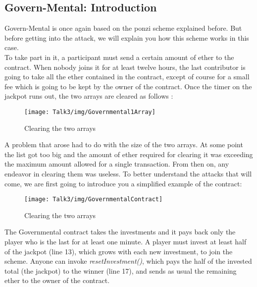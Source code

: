 \subsection{Govern-Mental: Introduction}
Govern-Mental is once again based on the ponzi scheme explained before. But before getting into the attack, we will explain you how this scheme works in this case.\\
To take part in it, a participant must send a  certain amount of ether to the contract. When nobody joins it for at least twelve hours, the last contributor is going to take all the ether contained in the contract, except of course for a small fee which is going to be kept by the owner of the contract.
Once the timer on the jackpot runs out, the two arrays are cleared as follows \cite{paper2}:
\begin{figure}[H]
\begin{center}
\texttt{[image: Talk3/img/Governmental1Array]}
\end{center}
\caption{Clearing the two arrays}
\label{label}
\end{figure}
A problem that arose had to do with the size of the two arrays. At some point the list got too big and the amount of ether required for clearing it was exceeding the maximum amount allowed for a single transaction. From then on, any endeavor in clearing them was useless.
To better understand the attacks that will come, we are first going to introduce you a simplified example of the contract:
\begin{figure}[H]
\begin{center}
\texttt{[image: Talk3/img/GovernmentalContract]}
\end{center}
\caption{Clearing the two arrays}
\label{label}
\end{figure}
The Governmental contract takes the investments and it pays back only the player who is the last for at least one minute. A player must invest at least half of the jackpot (line 13), which grows with each new investment, to join the scheme. Anyone can invoke \textit{resetInvestment()}, which pays the half of the invested total (the jackpot) to the winner (line 17), and sends as usual the remaining ether to the owner of the contract.

